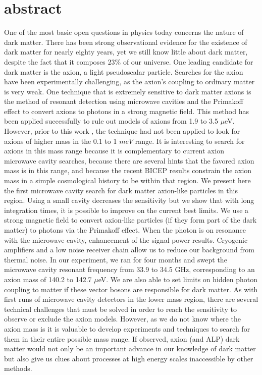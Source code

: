 \documentclass[12pt,twosides]{book}
\begin{document}
\section{abstract}

One of the most basic open questions in physics today concerns the nature of dark matter. There has been strong observational evidence for the existence of dark matter for nearly eighty years, yet we still know little about dark matter, despite the fact that it composes $23\%$ of our universe. One leading candidate for dark matter is the axion, a light pseudoscalar particle. Searches for the axion have been experimentally challenging, as the axion's coupling to ordinary matter is very weak. One technique that is extremely sensitive to dark matter axions is the method of resonant detection using microwave cavities and the Primakoff effect to convert axions to photons in a strong magnetic field. This method has been applied successfully to rule out models of axions from 1.9 to 3.5 $\mu$eV. However, prior to this work , the technique had not been applied to look for axions of higher mass in the 0.1 to 1 $meV$ range. It is interesting to search for axions in this mass range because it is complementary to current axion microwave cavity searches, because there are several hints that the favored axion mass is in this range, and because the recent BICEP results constrain the axion mass in a simple cosmological history to be within that region. We present here the first microwave cavity search for dark matter axion-like particles in this region. Using a small cavity decreases the sensitivity but we show that with long integration times, it is possible to improve on the current best limits. We use a strong magnetic field to convert axion-like particles (if they form part of the dark matter) to photons via the Primakoff effect. When the photon is on resonance with the microwave cavity, enhancement of the signal power results. Cryogenic amplifiers and a low noise receiver chain allow us to reduce our background from thermal noise. In our experiment, we ran for four months and swept the microwave cavity resonant frequency from 33.9 to 34.5 GHz, corresponding to an axion mass of 140.2  to 142.7 $\mu$eV. We are also able to set limits on hidden photon coupling to matter if these vector bosons are responsible for dark matter. As with first runs of microwave cavity detectors in the lower mass region, there are several technical challenges that must be solved in order to reach the sensitivity to observe or exclude the axion models. However, as we do not know where the axion mass is it is valuable to develop experiments and techniques to search for them in their entire possible mass range. If observed, axion (and ALP) dark matter would not only be an important advance in our knowledge of dark matter but also give us clues about processes at high energy scales inaccessible by other methods.
\end{document}
